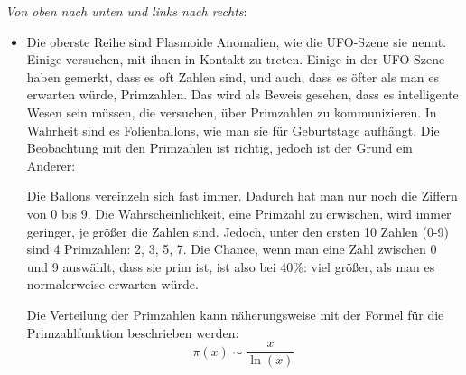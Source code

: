 \documentclass{scrartcl}
\begin{document}
\textit{Von oben nach unten und links nach rechts}:

\begin{itemize}
    \item Die oberste Reihe sind \frq Plasmoide Anomalien\flq, wie die UFO-Szene sie nennt. Einige versuchen, mit ihnen in Kontakt zu treten. Einige in der UFO-Szene haben gemerkt, dass es oft Zahlen sind, und auch, dass es öfter als man es erwarten würde, Primzahlen. Das wird als Beweis gesehen, dass es intelligente Wesen sein müssen, die versuchen, über Primzahlen zu kommunizieren. In Wahrheit sind es Folienballons, wie man sie für Geburtstage aufhängt. Die Beobachtung mit den Primzahlen ist richtig, jedoch ist der Grund ein Anderer:

    Die Ballons vereinzeln sich fast immer. Dadurch hat man nur noch die Ziffern von 0 bis 9. Die Wahrscheinlichkeit, eine Primzahl zu \frq erwischen\flq, wird immer geringer, je größer die Zahlen sind. Jedoch, unter den ersten 10 Zahlen (0-9) sind 4 Primzahlen: 2, 3, 5, 7. Die Chance, wenn man eine Zahl zwischen 0 und 9 auswählt, dass sie prim ist, ist also bei 40\%: viel größer, als man es normalerweise erwarten würde.

    Die Verteilung der Primzahlen kann näherungsweise mit der Formel für die Primzahlfunktion beschrieben werden:
    \[
    \pi(x) \sim \frac{x}{\ln(x)}
    \]

    \loadedtable

    \loadedtablethousand


\end{itemize}
\end{document}
